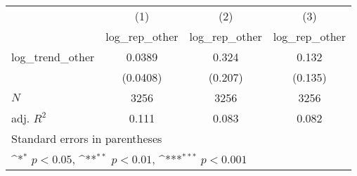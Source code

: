 {
\def\sym#1{\ifmmode^{#1}\else\(^{#1}\)\fi}
\begin{tabular}{l*{3}{c}}
\hline\hline
            &\multicolumn{1}{c}{(1)}&\multicolumn{1}{c}{(2)}&\multicolumn{1}{c}{(3)}\\
            &\multicolumn{1}{c}{log\_rep\_other}&\multicolumn{1}{c}{log\_rep\_other}&\multicolumn{1}{c}{log\_rep\_other}\\
\hline
log\_trend\_other&      0.0389         &       0.324         &       0.132         \\
            &    (0.0408)         &     (0.207)         &     (0.135)         \\
\hline
\(N\)       &        3256         &        3256         &        3256         \\
adj. \(R^{2}\)&       0.111         &       0.083         &       0.082         \\
\hline\hline
\multicolumn{4}{l}{\footnotesize Standard errors in parentheses}\\
\multicolumn{4}{l}{\footnotesize \sym{*} \(p<0.05\), \sym{**} \(p<0.01\), \sym{***} \(p<0.001\)}\\
\end{tabular}
}

